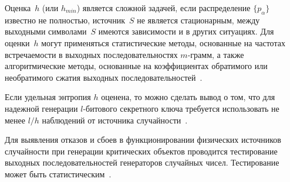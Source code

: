 Оценка~$h$ (или $h_{min}$) является сложной задачей, 
если распределение $\{p_\alpha\}$ известно не полностью,
источник~$S$ не является стационарным,
между выходными символами~$S$ имеются зависимости и в других ситуациях.
%
Для оценки~$h$ могут применяться статистические методы,
основанные на частотах встречаемости в выходных последовательностях
$m$-грамм, а также алгоритмические методы, основанные на коэффициентах 
обратимого или необратимого сжатия выходных 
последовательностей~.

Если удельная энтропия $h$ оценена, то можно сделать вывод о том, что для 
надежной генерации $l$-битового секретного ключа требуется использовать 
не менее $l/h$ наблюдений от источника случайности~.

Для выявления отказов и сбоев в функционировании физических источников 
случайности при генерации критических объектов проводится тестирование
выходных последовательностей генераторов случайных чисел. 
Тестирование может быть статистическим~. 

